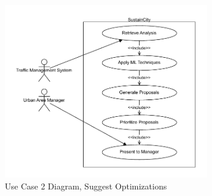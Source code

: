 \documentclass[a4paper,12pt]{article}
\begin{document}
\begin{figure}[h]
    \centering
    \includegraphics[width=0.8\textwidth]{diagrams/Suggest_Optimizations.drawio.pdf}
    \caption{Use Case 2 Diagram, Suggest Optimizations}
    \label{fig:Suggest_Optimizations.drawio}
\end{figure}
\\
\end{document}
